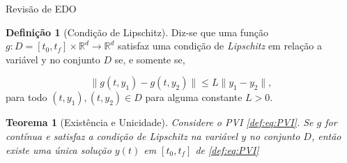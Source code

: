 \documentclass{beamer}
\newcommand{\R}{\mathbb{R}}
\theoremstyle{plain}
\newtheorem{teo}{Teorema}
\theoremstyle{definition}
\newtheorem{defi}{Definição}
\begin{document}
\begin{frame}{Revisão de EDO}

    \small
    \begin{defi}[Condição de Lipschitz]
        \label{def:2:condicao_de_lispchitz}
        Diz-se que uma função $g: D = [t_0, t_f] \times \R^d \to \R^d$ satisfaz uma condição de \textit{Lipschitz} em relação a variável y no conjunto $D$ se, e somente se,

        \begin{equation}
            \| g(t, y_1) - g(t, y_2) \| \leq L \| y_1 - y_2 \|, 
            \label{def:IVP_Lips}
        \end{equation}
        para todo $(t, y_1), (t, y_2) \in D$ para alguma constante $L>0$.
    \end{defi}


    \begin{teo}[Existência e Unicidade]
        
    \label{teo:1:PVI:existencia_unicidade}
    Considere o PVI \eqref{def:eq:PVI}. Se $g$ for contínua e satisfaz a condição de Lipschitz na variável $y$ no conjunto $D$, então existe uma única solução $y(t)$ em $[t_0, t_f]$ de \eqref{def:eq:PVI} 
    \end{teo}


\end{frame}
\end{document}
